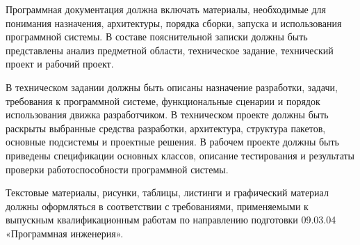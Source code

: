 Программная документация должна включать материалы, необходимые для понимания назначения, архитектуры, порядка сборки, запуска и использования программной системы. В составе пояснительной записки должны быть представлены анализ предметной области, техническое задание, технический проект и рабочий проект.

В техническом задании должны быть описаны назначение разработки, задачи, требования к программной системе, функциональные сценарии и порядок использования движка разработчиком. В техническом проекте должны быть раскрыты выбранные средства разработки, архитектура, структура пакетов, основные подсистемы и проектные решения. В рабочем проекте должны быть приведены спецификации основных классов, описание тестирования и результаты проверки работоспособности программной системы.

Текстовые материалы, рисунки, таблицы, листинги и графический материал должны оформляться в соответствии с требованиями, применяемыми к выпускным квалификационным работам по направлению подготовки 09.03.04 «Программная инженерия».

